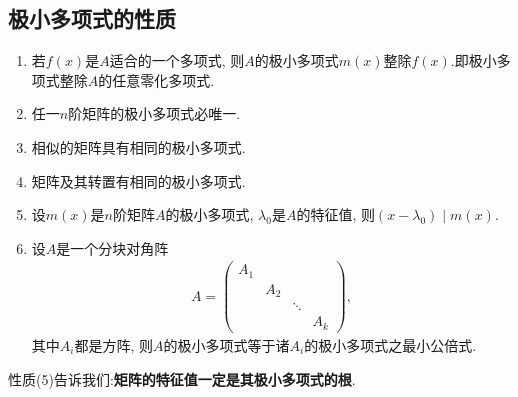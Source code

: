 \documentclass[../../main.tex]{subfiles}
\begin{document}
\subsection{极小多项式的性质}

\begin{proposition}[极小多项式的性质]\label{proposition:极小多项式的性质}
\begin{enumerate}[(1)]
\item 若$f(x)$是$A$适合的一个多项式, 则$A$的极小多项式$m(x)$整除$f(x)$.即极小多项式整除$A$的任意零化多项式.

\item 任一$n$阶矩阵的极小多项式必唯一.

\item 相似的矩阵具有相同的极小多项式.

\item 矩阵及其转置有相同的极小多项式.

\item 设$m(x)$是$n$阶矩阵$A$的极小多项式, $\lambda_0$是$A$的特征值, 则$(x - \lambda_0) \mid m(x)$.

\item 设$A$是一个分块对角阵
\begin{align*}
A = \begin{pmatrix}
A_1 & & \\
& A_2 & \\
& & \ddots & \\
& & & A_k
\end{pmatrix},
\end{align*}
其中$A_i$都是方阵, 则$A$的极小多项式等于诸$A_i$的极小多项式之最小公倍式.
\end{enumerate}
\end{proposition}
\begin{note}
性质(5)告诉我们:\textbf{矩阵的特征值一定是其极小多项式的根}.
\end{note}
\end{document}
